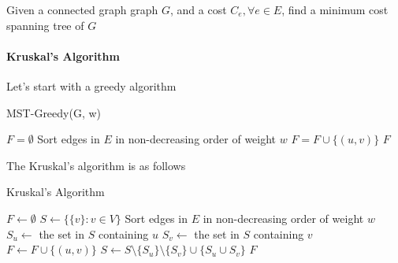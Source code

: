                     \begin{definition}
                        Given a connected graph graph $G$, and a cost $C_e, \forall e\in E$, find a minimum cost spanning tree of $G$
                    \end{definition}

                \paragraph{Kruskal's Algorithm}
                    Let's start with a greedy algorithm

                    \begin{algorithm}[H]
                        \caption{MST-Greedy(G, w)}
                        \begin{algorithmic}[1]
                            \State $F = \emptyset$
                            \State Sort edges in $E$ in non-decreasing order of weight $w$
                                    \State $F = F \cup \{(u, v)\}$
                                \EndIf
                            \EndFor
                            \State \Return $F$
                        \end{algorithmic}
                    \end{algorithm}


                    The Kruskal's algorithm is as follows
                    \begin{algorithm}[H]
                        \caption{Kruskal's Algorithm}
                        \begin{algorithmic}
                            \State $F \gets \emptyset$
                            \State $S \gets \{\{v\}: v \in V\}$
                            \State Sort edges in $E$ in non-decreasing order of weight $w$
                                \State $S_u \gets$ the set in $S$ containing $u$
                                \State $S_v \gets$ the set in $S$ containing $v$
                                    \State $F \gets F \cup \{(u, v)\}$
                                    \State $S \gets S \setminus \{S_u\} \setminus \{S_v\} \cup \{S_u \cup S_v\}$
                                \EndIf
                            \EndFor
                            \State \Return $F$
                        \end{algorithmic}
                    \end{algorithm}


